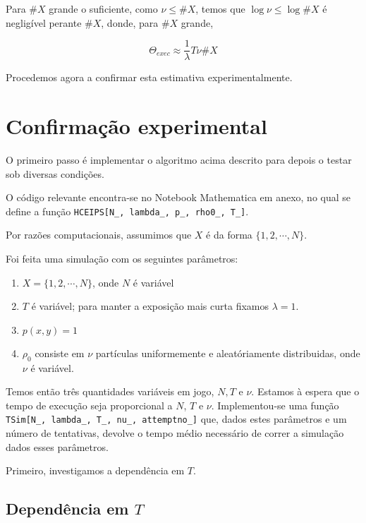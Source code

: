 \documentclass{article}
\begin{document}
	Para $\#X$ grande o suficiente, como $\nu \leq \#X$, temos que $\log \nu \leq \log \#X$ é negligível perante $\#X$, donde, para $\#X$ grande,
	
	\[\Theta_{exec} \approx \frac 1 \lambda T \nu \#\!X\]
	
	Procedemos agora a confirmar esta estimativa experimentalmente.
	
	\section{Confirmação experimental}
	
	O primeiro passo é implementar o algoritmo acima descrito para depois o testar sob diversas condições.
	
	O código relevante encontra-se no Notebook Mathematica em anexo, no qual se define a função \texttt{HCEIPS[N\_, lambda\_, p\_, rho0\_, T\_]}.
	
	Por razões computacionais, assumimos que $X$ é da forma $\{1, 2, \cdots, N\}$.
	
	Foi feita uma simulação com os seguintes parâmetros:
	
	\begin{enumerate}
	\item $X = \{1, 2, \cdots, N\}$, onde $N$ é variável
	
	\item $T$ é variável; para manter a exposição mais curta fixamos $\lambda = 1$.
	
	\item $p(x,y) = 1$
	
	\item $\rho_0$ consiste em $\nu$ partículas uniformemente e aleatóriamente distribuidas, onde $\nu$ é variável.
	\end{enumerate}
	
	Temos então três quantidades variáveis em jogo, $N, T$ e $\nu$. Estamos à espera que o tempo de execução seja proporcional a $N$, $T$ e $\nu$. Implementou-se uma função \texttt{TSim[N\_, lambda\_, T\_, nu\_, attemptno\_]} que, dados estes parâmetros e um número de tentativas, devolve o tempo médio necessário de correr a simulação dados esses parâmetros.
	
	Primeiro, investigamos a dependência em $T$.
	
	\subsection{Dependência em $T$}
	
\end{document}
